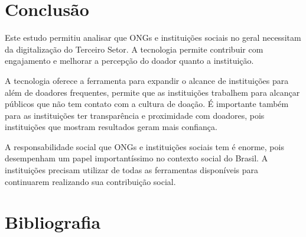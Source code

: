 \documentclass[conference]{IEEEtran}
\begin{document}
\section{Conclusão}
Este estudo permitiu analisar que ONGs e instituições sociais no geral necessitam da digitalização do Terceiro Setor. A tecnologia permite contribuir com engajamento e melhorar a percepção do doador quanto a instituição. 

A tecnologia oferece a ferramenta para expandir o alcance de instituições para além de doadores frequentes, permite que as instituições trabalhem para alcançar públicos que não tem contato com a cultura de doação. É importante também para as instituições ter transparência e proximidade com doadores, pois instituições que mostram resultados geram mais confiança. 

A responsabilidade social que ONGs e instituições sociais tem é enorme, pois desempenham um papel importantíssimo no contexto social do Brasil. A instituições precisam utilizar de todas as ferramentas disponíveis para continuarem realizando sua contribuição social.


\section{Bibliografia}


\end{document}
